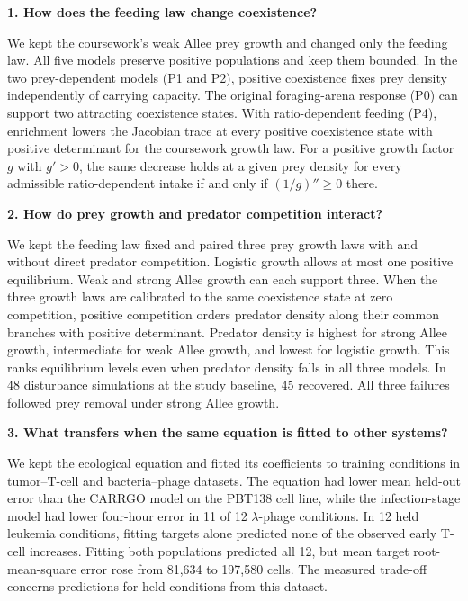 \noindent\textbf{1. How does the feeding law change coexistence?}\par
We kept the coursework's weak Allee prey growth and changed only the feeding law. All five models preserve positive populations and keep them bounded. In the two prey-dependent models (P1 and P2), positive coexistence fixes prey density independently of carrying capacity. The original foraging-arena response (P0) can support two attracting coexistence states. With ratio-dependent feeding (P4), enrichment lowers the Jacobian trace at every positive coexistence state with positive determinant for the coursework growth law. For a positive growth factor $g$ with $g'>0$, the same decrease holds at a given prey density for every admissible ratio-dependent intake if and only if $(1/g)''\geq0$ there.

\medskip
\noindent\textbf{2. How do prey growth and predator competition interact?}\par
We kept the feeding law fixed and paired three prey growth laws with and without direct predator competition. Logistic growth allows at most one positive equilibrium. Weak and strong Allee growth can each support three. When the three growth laws are calibrated to the same coexistence state at zero competition, positive competition orders predator density along their common branches with positive determinant. Predator density is highest for strong Allee growth, intermediate for weak Allee growth, and lowest for logistic growth. This ranks equilibrium levels even when predator density falls in all three models. In 48 disturbance simulations at the study baseline, 45 recovered. All three failures followed prey removal under strong Allee growth.

\medskip
\noindent\textbf{3. What transfers when the same equation is fitted to other systems?}\par
We kept the ecological equation and fitted its coefficients to training conditions in tumor--T-cell and bacteria--phage datasets. The equation had lower mean held-out error than the CARRGO model on the PBT138 cell line, while the infection-stage model had lower four-hour error in 11 of 12 $\lambda$-phage conditions. In 12 held leukemia conditions, fitting targets alone predicted none of the observed early T-cell increases. Fitting both populations predicted all 12, but mean target root-mean-square error rose from 81,634 to 197,580 cells. The measured trade-off concerns predictions for held conditions from this dataset.
